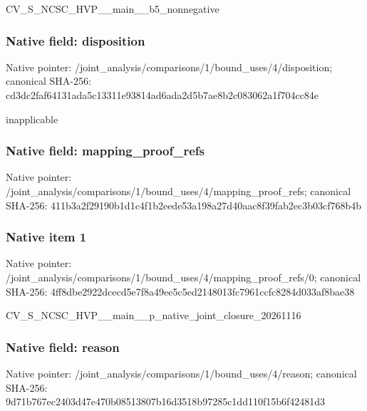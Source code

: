 \documentclass[10pt,a4paper]{article}
\begin{document}
\begingroup\raggedright\sloppy CV\_\allowbreak{}S\_\allowbreak{}NCSC\_\allowbreak{}HVP\_\allowbreak{}\_\allowbreak{}main\_\allowbreak{}\_\allowbreak{}b5\_\allowbreak{}nonnegative\par\endgroup

\subsubsection{Native field: disposition}
Native pointer: /joint\_\allowbreak{}analysis/comparisons/1/bound\_\allowbreak{}uses/4/disposition; canonical SHA-256: cd3dc2faf64131ada5c13311e93814ad6ada2d5b7ae8b2c083062a1f704cc84e

\begingroup\raggedright\sloppy inapplicable\par\endgroup

\subsubsection{Native field: mapping\_\allowbreak{}proof\_\allowbreak{}refs}
Native pointer: /joint\_\allowbreak{}analysis/comparisons/1/bound\_\allowbreak{}uses/4/mapping\_\allowbreak{}proof\_\allowbreak{}refs; canonical SHA-256: 411b3a2f29190b1d1c4f1b2eede53a198a27d40aac8f39fab2ec3b03cf768b4b

\subsubsection{Native item 1}
Native pointer: /joint\_\allowbreak{}analysis/comparisons/1/bound\_\allowbreak{}uses/4/mapping\_\allowbreak{}proof\_\allowbreak{}refs/0; canonical SHA-256: 4ff8dbe2922dcecd5e7f8a49ee5c5ed2148013fc7961ccfc8284d033af8bae38

\begingroup\raggedright\sloppy CV\_\allowbreak{}S\_\allowbreak{}NCSC\_\allowbreak{}HVP\_\allowbreak{}\_\allowbreak{}main\_\allowbreak{}\_\allowbreak{}p\_\allowbreak{}native\_\allowbreak{}joint\_\allowbreak{}closure\_\allowbreak{}20261116\par\endgroup

\subsubsection{Native field: reason}
Native pointer: /joint\_\allowbreak{}analysis/comparisons/1/bound\_\allowbreak{}uses/4/reason; canonical SHA-256: 9d71b767ec2403d47e470b08513807b16d3518b97285c1dd110f15b6f42481d3
\end{document}
